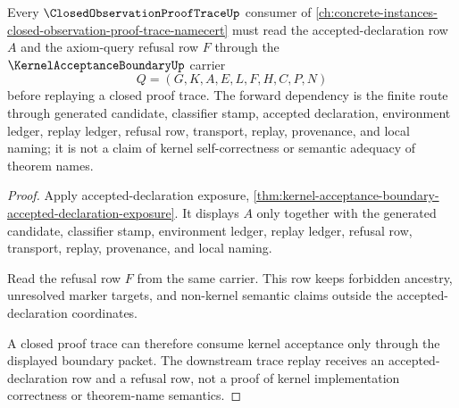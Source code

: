 \begin{theorem}
\label{thm:kernel-acceptance-boundary-closed-trace-forward-link}
Every $\ClosedObservationProofTraceUp$ consumer of \autoref{ch:concrete-instances-closed-observation-proof-trace-namecert} must read the accepted-declaration row $A$ and the axiom-query refusal row $F$ through the $\KernelAcceptanceBoundaryUp$ carrier
$$
Q=(G,K,A,E,L,F,H,C,P,N)
$$
before replaying a closed proof trace. The forward dependency is the finite route through generated candidate, classifier stamp, accepted declaration, environment ledger, replay ledger, refusal row, transport, replay, provenance, and local naming; it is not a claim of kernel self-correctness or semantic adequacy of theorem names.
\end{theorem}
\begin{proof}
Apply accepted-declaration exposure, \autoref{thm:kernel-acceptance-boundary-accepted-declaration-exposure}. It displays $A$ only together with the generated candidate, classifier stamp, environment ledger, replay ledger, refusal row, transport, replay, provenance, and local naming.

Read the refusal row $F$ from the same carrier. This row keeps forbidden ancestry, unresolved marker targets, and non-kernel semantic claims outside the accepted-declaration coordinates.

A closed proof trace can therefore consume kernel acceptance only through the displayed boundary packet. The downstream trace replay receives an accepted-declaration row and a refusal row, not a proof of kernel implementation correctness or theorem-name semantics.
\end{proof}

